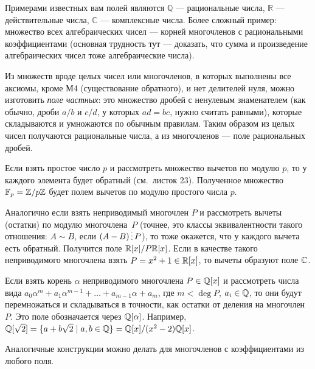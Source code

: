 \documentclass[a4paper,12pt]{article}
\begin{document}
\smallskip

Примерами известных вам полей являются $\mathbb Q$ — рациональные числа, $\mathbb R$ — действительные числа, $\mathbb C$ — комплексные числа.
Более сложный пример: множество всех алгебраических чисел — корней многочленов с рациональными коэффициентами (основная трудность тут --- доказать,
что сумма и произведение алгебраических чисел тоже алгебраические числа).

Из множеств вроде целых чисел или многочленов, в которых выполнены все аксиомы, кроме М4 (существование обратного), и нет делителей нуля, можно изготовить \textit{поле частных}:
это множество дробей с ненулевым знаменателем (как обычно, дроби $a/b$ и $c/d$, у которых $ad = bc$, нужно считать равными), которые складываются и умножаются по обычным правилам.
Таким образом из целых чисел получаются рациональные числа, а из многочленов — поле рациональных дробей.

Если взять простое число $p$ и рассмотреть множество вычетов по модулю $p$, то у каждого элемента будет обратный (см.~листок 23).
Полученное множество $\mathbb F_p = \mathbb{Z}/p\mathbb{Z}$ будет полем вычетов по модулю простого числа $p$.

Аналогично если взять неприводимый многочлен $P$ и рассмотреть вычеты (остатки) по модулю многочлена~$P$
(точнее, это классы эквивалентности такого отношения: $A\sim B$, если $(A-B) \dv P$),
то тоже окажется, что у каждого вычета есть обратный.
Получится поле $\mathbb{R}[x]/P\mathbb{R}[x]$.
Если в качестве такого неприводимого многочлена взять $P=x^2+1\in\mathbb{R}[x]$, то вычеты образуют поле $\mathbb{C}$.

Если взять корень $\alpha$ неприводимого многочлена $P\in\mathbb{Q}[x]$ и рассмотреть числа вида $a_0 \alpha^m + a_1 \alpha^{m-1}+\ldots+a_{m-1}\alpha + a_m$, где $m < \deg P$, $a_i \in \mathbb{Q}$, то они будут перемножаться и складываться в точности, как остатки от деления на многочлен $P$.
Это поле обозначается через $\mathbb{Q}[\alpha]$.
Например, $\mathbb{Q}[\sqrt{2}] =\{ a+b\sqrt{2}\mid a,b \in \mathbb{Q}\} = \mathbb{Q}[x] / (x^2-2)\mathbb{Q}[x]$.

Аналогичные конструкции можно делать для многочленов с коэффициентами из любого поля.


\end{document}
